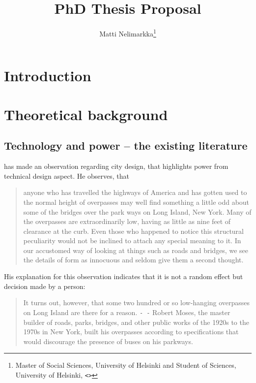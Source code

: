 \documentclass[12pt,a4paper]{article}
\author{Matti Nelimarkka\footnote{Master of Social Sciences, University of Helsinki and Student of Sciences, University of Helsinki, \texttt{<\email{matti.nelimarkka@hiit.fi}>}}}
\title{PhD Thesis Proposal}
\begin{document}
\maketitle

\tableofcontents

\newpage

\section{Introduction}

\section{Theoretical background}

\subsection{Technology and power -- the existing literature}

 has made an observation regarding city design, that highlights power from technical design aspect. He observes, that

\begin{quote}
anyone who has travelled the highways of America and has gotten used to the normal height of overpasses may well find something a little odd about some of the bridges over the park ways on Long Island, New York. Many of the overpasses are extraordinarily low, having as little as nine feet of clearance at the curb. Even those who happened to notice this structural peculiarity would not be inclined to attach any special meaning to it. In our accustomed way of looking at things such as roads and bridges, we see the details of form as innocuous and seldom give them a second thought.
\end{quote}

His explanation for this observation indicates that it is not a random effect but decision made by a person:

\begin{quote}
It turns out, however, that some two hundred or so low-hanging overpasses on Long Island are there for a reason. \texttt{- -} Robert Moses, the master builder of roads, parks, bridges, and other public works of the 1920s to the 1970s in New York, built his overpasses according to specifications that would discourage the presence of buses on his parkways.
\end{quote}
\end{document}

